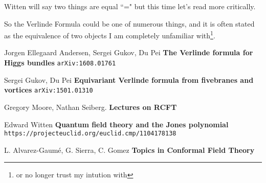 \documentclass[12pt]{article}
\begin{document}
\noindent Witten will say two things are equal ``=" but this time let's read more critically. \newline

\noindent So the Verlinde Formula could be one of numerous things, and it is often stated as the equivalence of two objects I am completely unfamiliar with\footnote{or no longer trust my intution with}.

\newpage


\selectfont \fontsize{12}{10}\selectfont

\begin{thebibliography}{}

\item Jorgen Ellegaard Andersen, Sergei Gukov, Du Pei \textbf{The Verlinde formula for Higgs bundles} \texttt{arXiv:1608.01761
}

\item Sergei Gukov, Du Pei
\textbf{Equivariant Verlinde formula from fivebranes and vortices}
\texttt{arXiv:1501.01310}

\item Gregory Moore, Nathan Seiberg. \textbf{Lectures on RCFT}

\item Edward Witten \textbf{Quantum field theory and the Jones polynomial} \texttt{https://projecteuclid.org/euclid.cmp/1104178138}

\item L. Alvarez-Gaum\'{e}, G. Sierra, C. Gomez \textbf{Topics in Conformal Field Theory}

\end{thebibliography}
\end{document}
